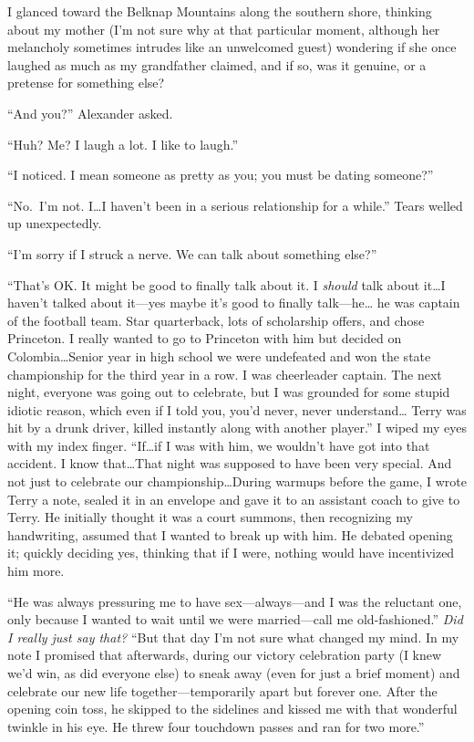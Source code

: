 I glanced toward the Belknap Mountains along the southern shore,
thinking about my mother (I'm not sure why at that particular moment,
although her melancholy sometimes intrudes like an unwelcomed guest)
wondering if she once laughed as much as my grandfather claimed, and if
so, was it genuine, or a pretense for something else?

``And you?'' Alexander asked.

``Huh? Me? I laugh a lot. I like to laugh.''

``I noticed. I mean someone as pretty as you; you must be dating
someone?''

``No.~I'm not. I\ldots I haven't been in a serious relationship for a
while.'' Tears welled up unexpectedly.

``I'm sorry if I struck a nerve. We can talk about something else?''

``That's OK. It might be good to finally talk about it. I \emph{should}
talk about it\ldots I haven't talked about it---yes maybe it's good to
finally talk---he\ldots{} he was captain of the football team. Star
quarterback, lots of scholarship offers, and chose Princeton. I really
wanted to go to Princeton with him but decided on Colombia\ldots Senior
year in high school we were undefeated and won the state championship
for the third year in a row. I was cheerleader captain. The next night,
everyone was going out to celebrate, but I was grounded for some stupid
idiotic reason, which even if I told you, you'd never, never
understand\ldots{} Terry was hit by a drunk driver, killed instantly
along with another player.'' I wiped my eyes with my index finger.
``If\ldots if I was with him, we wouldn't have got into that accident. I
know that\ldots That night was supposed to have been very special. And
not just to celebrate our championship\ldots During warmups before the
game, I wrote Terry a note, sealed it in an envelope and gave it to an
assistant coach to give to Terry. He initially thought it was a court
summons, then recognizing my handwriting, assumed that I wanted to break
up with him. He debated opening it; quickly deciding yes, thinking that
if I were, nothing would have incentivized him more.

``He was always pressuring me to have sex---always---and I was the
reluctant one, only because I wanted to wait until we were
married---call me old-fashioned.'' \emph{Did I really just say that?}
``But that day I'm not sure what changed my mind. In my note I promised
that afterwards, during our victory celebration party (I knew we'd win,
as did everyone else) to sneak away (even for just a brief moment) and
celebrate our new life together---temporarily apart but forever one.
After the opening coin toss, he skipped to the sidelines and kissed me
with that wonderful twinkle in his eye. He threw four touchdown passes
and ran for two more.''

